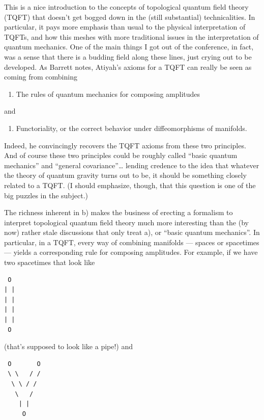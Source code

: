 \documentclass{article}
\def\tightlist{}
\begin{document}
This is a nice introduction to the concepts of topological quantum field
theory (TQFT) that doesn't get bogged down in the (still substantial)
technicalities. In particular, it pays more emphasis than usual to the
physical interpretation of TQFTs, and how this meshes with more
traditional issues in the interpretation of quantum mechanics. One of
the main things I got out of the conference, in fact, was a sense that
there is a budding field along these lines, just crying out to be
developed. As Barrett notes, Atiyah's axioms for a TQFT can really be
seen as coming from combining

\begin{enumerate}
\def\labelenumi{\alph{enumi})}
\tightlist
\item
  The rules of quantum mechanics for composing amplitudes
\end{enumerate}

and

\begin{enumerate}
\def\labelenumi{\alph{enumi})}
\setcounter{enumi}{1}
\tightlist
\item
  Functoriality, or the correct behavior under diffeomorphisms of
  manifolds.
\end{enumerate}

Indeed, he convincingly recovers the TQFT axioms from these two
principles. And of course these two principles could be roughly called
``basic quantum mechanics'' and ``general covariance''\ldots{} lending
credence to the idea that whatever the theory of quantum gravity turns
out to be, it should be something closely related to a TQFT. (I should
emphasize, though, that this question is one of the big puzzles in the
subject.)

The richness inherent in b) makes the business of erecting a formalism
to interpret topological quantum field theory much more interesting than
the (by now) rather stale discussions that only treat a), or ``basic
quantum mechanics''. In particular, in a TQFT, every way of combining
manifolds --- spaces or spacetimes --- yields a corresponding rule for
composing amplitudes. For example, if we have two spacetimes that look
like

\begin{verbatim}
 O
| |
| |
| |
| |
 O
\end{verbatim}

(that's supposed to look like a pipe!) and

\begin{verbatim}
 O       O
 \ \   / /
  \ \ / /
   \   /
    | |
     O
\end{verbatim}
\end{document}
